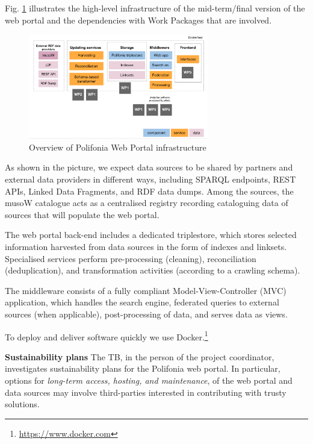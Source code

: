 Fig. \ref{fig:infrastructure} illustrates the high-level infrastructure of the mid-term/final version of the web portal and the dependencies with Work Packages that are involved.

\begin{figure}
    \centering
    \includegraphics[width=0.7\textwidth]{images/webportal.png}
    \caption{Overview of Polifonia Web Portal infrastructure}
    \label{fig:infrastructure}
\end{figure}


As shown in the picture, we expect data sources to be shared by partners and external data providers in different ways, including SPARQL endpoints, REST APIs, Linked Data Fragments, and RDF data dumps. Among the sources, the musoW catalogue acts as a centralised registry recording cataloguing data of sources that will populate the web portal. 

The web portal back-end includes a dedicated triplestore, which stores selected information harvested from data sources in the form of indexes and linksets. Specialised services perform pre-processing (cleaning), reconciliation (deduplication), and transformation activities (according to a crawling schema). 

The middleware consists of a fully compliant Model-View-Controller (MVC) application, which handles the search engine, federated queries to external sources (when applicable), post-processing of data, and serves data as views.

To deploy and deliver software quickly we use Docker.\footnote{\url{https://www.docker.com}}

\textbf{Sustainability plans} The TB, in the person of the project coordinator, investigates sustainability plans for the Polifonia web portal. In particular, options for \emph{long-term access, hosting, and maintenance}, of the web portal and data sources may involve third-parties interested in contributing with trusty solutions. 

